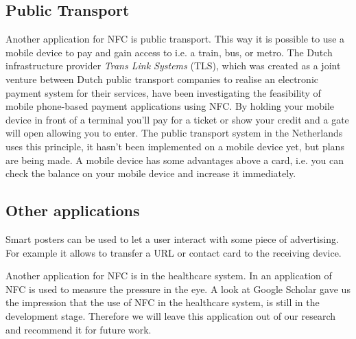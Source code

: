 \subsection{Public Transport}
Another application for NFC is public transport.
This way it is possible to use a mobile device to pay and gain access to i.e. a train, bus, or metro.
The Dutch infrastructure provider \textit{Trans Link Systems} (TLS), which was created as a joint venture between Dutch public transport companies to realise an electronic payment system for their services, have been investigating the feasibility of mobile phone-based payment applications using NFC. %
By holding your mobile device in front of a terminal you'll pay for a ticket or show your credit and a gate will open allowing you to enter.
The public transport system in the Netherlands uses this principle, it hasn't been implemented on a mobile device yet, but plans are being made. A mobile device has some advantages above a card, i.e. you can check the balance on your mobile device and increase it immediately. %

\subsection{Other applications}

Smart posters can be used to let a user interact with some piece of advertising.
For example it allows to transfer a URL or contact card to the receiving device.

Another application for NFC is in the healthcare system.
In \cite{RFIDHB} an application of NFC is used to measure the pressure in the eye.
A look at Google Scholar gave us the impression that the use of NFC in the healthcare system, is still in the development stage. %
Therefore we will leave this application out of our research and recommend it for future work. %

